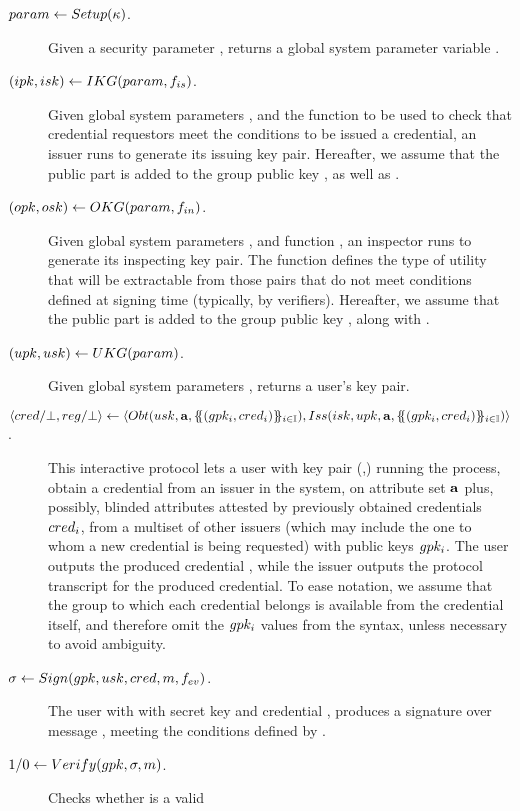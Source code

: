 \begin{description}
\item[$param \gets Setup(\kappa)$.] Given a security parameter \secpar,
  returns a global system parameter variable \parm.
\item[$(ipk,isk) \gets IKG(param,f_{is})$.] Given global system
  parameters \parm, and the function \fissue to be used to check that credential
  requestors meet the conditions to be issued a credential, an issuer runs
  \IKeyGen to generate its issuing key pair. Hereafter, we assume that the
  public part \ipk is added to the group public key \gpk, as well as \fissue.
\item[$(opk,osk) \gets OKG(param,f_{in})$.] Given global system
  parameters \parm, and function \finsp, an inspector runs \OKeyGen to generate
  its inspecting key pair. The function \finsp defines the type of utility that
  will be extractable from those pairs that do not meet conditions defined
  at signing time (typically, by verifiers). Hereafter, we assume that the
  public part \opk is added to the group public key \gpk, along with \finsp.
\item[$(upk,usk) \gets UKG(param)$.] Given global system parameters
  \parm, returns a user's key pair.
\item[$\langle cred/\bot,reg/\bot \rangle \gets
  \langle
  Obt(usk,\mathbf{a},\{\mskip-5mu\{ (gpk_i,cred_i)\}\mskip-5mu\}_{i \in \mathbb{I}}),
  Iss(isk,upk,\mathbf{a},\{\mskip-5mu\{ (gpk_i,cred_i) \}\mskip-5mu\}_{i \in \mathbb{I}})
  \rangle$.] %
  This interactive protocol lets a user with key pair (\upk,\usk) running the
  \Obtain process, obtain a credential \cred from an issuer in the system, on
  attribute set $\mathbf{a}$ plus, possibly, blinded attributes attested by
  previously obtained credentials $cred_i$, from a multiset of other issuers
  (which may include the one to whom a new credential is being requested) with
  public keys $gpk_i$. The user outputs the produced credential \cred, while
  the issuer outputs the protocol transcript \utrans for the produced
  credential. To ease notation, we assume that the group to which each
  credential belongs is available from the credential itself, and therefore
  omit the $gpk_i$ values from the syntax, unless necessary to avoid ambiguity.
\item[$\sigma \gets Sign(gpk,usk,cred,m,f_{ev})$.]
  The user with with secret key \usk and credential \cred, produces a signature
  \sig over message \msg, meeting the conditions defined by \feval.
\item[$1/0 \gets Verify(gpk,\sigma,m)$.] Checks whether \sig is a valid

\end{description}
